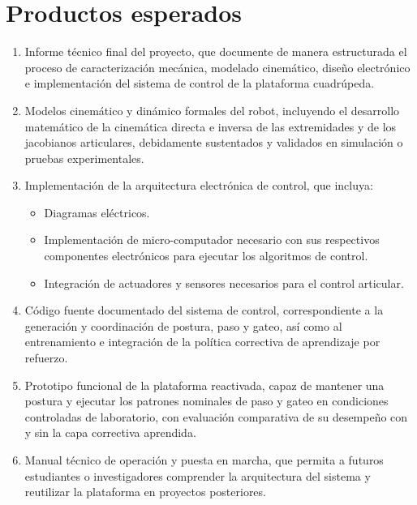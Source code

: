 \section{Productos esperados}


\begin{enumerate}

\item Informe técnico final del proyecto, que documente de manera estructurada el proceso de caracterización mecánica, modelado cinemático, diseño electrónico e implementación del sistema de control de la plataforma cuadrúpeda.

\item Modelos cinemático y dinámico formales del robot, incluyendo el desarrollo matemático de la cinemática directa e inversa de las extremidades y de los jacobianos articulares, debidamente sustentados y validados en simulación o pruebas experimentales.

\item Implementación de la arquitectura electrónica de control, que incluya:

\begin{itemize}

\item Diagramas eléctricos.

\item Implementación de micro-computador necesario con sus respectivos componentes electrónicos para ejecutar los algoritmos de control.

\item Integración de actuadores y sensores necesarios para el control articular.

\end{itemize}

\item Código fuente documentado del sistema de control, correspondiente a la
generación y coordinación de postura, paso y gateo, así como al entrenamiento e
integración de la política correctiva de aprendizaje por refuerzo.

\item Prototipo funcional de la plataforma reactivada, capaz de mantener una
postura y ejecutar los patrones nominales de paso y gateo en condiciones
controladas de laboratorio, con evaluación comparativa de su desempeño con y
sin la capa correctiva aprendida.

\item Manual técnico de operación y puesta en marcha, que permita a futuros estudiantes o investigadores comprender la arquitectura del sistema y reutilizar la plataforma en proyectos posteriores.

\end{enumerate}
